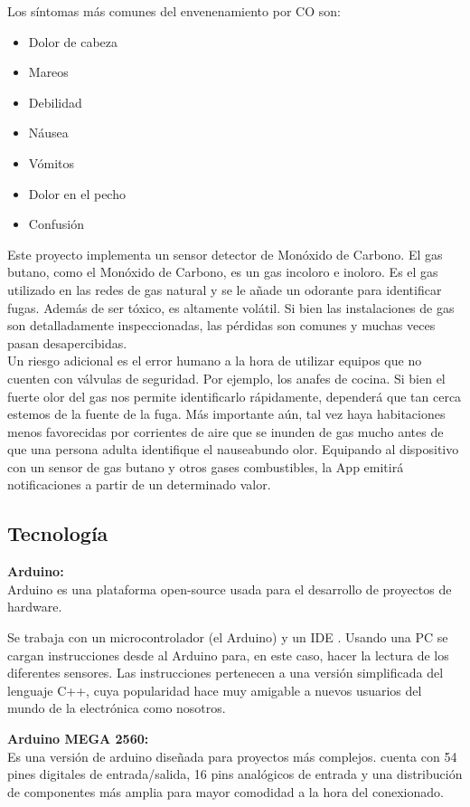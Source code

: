 \documentclass{IEEEtran}
\begin{document}
Los síntomas más comunes del envenenamiento por CO son\cite{refgases1}:
			\begin{itemize}
				\item Dolor de cabeza
				\item Mareos
				\item Debilidad
				\item Náusea
				\item Vómitos
				\item Dolor en el pecho
				\item Confusión
			\end{itemize}
Este proyecto implementa un sensor detector de Monóxido de Carbono. 
El gas butano, como el Monóxido de Carbono, es un gas incoloro e inoloro. Es el gas utilizado en las redes de gas natural y se le añade un odorante para identificar fugas. Además de ser tóxico, es altamente volátil.
Si bien las instalaciones de gas son detalladamente inspeccionadas, las pérdidas son comunes y muchas veces pasan desapercibidas. \\
Un riesgo adicional es el error humano a la hora de utilizar equipos que no cuenten con válvulas de seguridad. Por ejemplo, los anafes de cocina. Si bien el fuerte olor del gas nos permite identificarlo rápidamente, dependerá que tan cerca estemos de la fuente de la fuga. Más importante aún, tal vez haya habitaciones menos favorecidas por corrientes de aire que se inunden de gas mucho antes de que una persona adulta identifique el nauseabundo olor.
Equipando al dispositivo con un sensor de gas butano y otros gases combustibles, la App emitirá notificaciones a partir de un determinado valor.
			
			
		\subsection{Tecnología} 
		
		    \textbf{Arduino:} \\
		    Arduino es una plataforma open-source\cite{refopensource} usada para el desarrollo de proyectos de hardware. 

			Se trabaja con un microcontrolador (el Arduino) y un IDE \cite{refarduinoide}. Usando una PC se cargan instrucciones desde al Arduino para, en este caso, hacer la lectura de los diferentes sensores. Las instrucciones pertenecen a una versión simplificada del lenguaje C++, cuya popularidad hace muy amigable a nuevos usuarios del mundo de la electrónica como nosotros.


		    \textbf{Arduino MEGA 2560:} \\
		    Es una versión de arduino diseñada para proyectos más complejos. cuenta con 54 pines digitales de entrada/salida, 16 pins analógicos de entrada y una distribución de componentes más amplia para mayor comodidad a la hora del conexionado.
\end{document}
